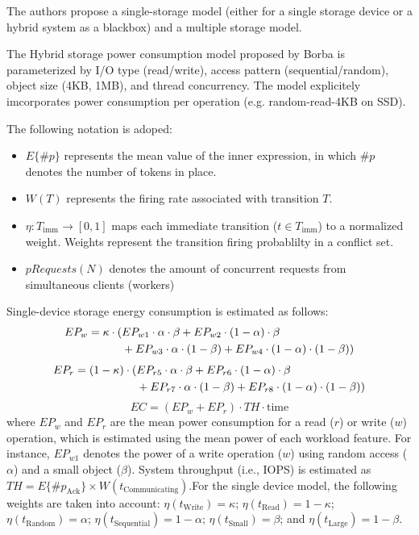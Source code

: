The authors propose a single-storage model (either for a single storage device or a hybrid system as a blackbox) and a multiple storage model.

The Hybrid storage power consumption model proposed by Borba is parameterized by I/O type (read/write), access pattern (sequential/random), object size (4KB, 1MB), and thread concurrency. The model explicitely imcorporates power consumption per operation (e.g. random-read-4KB on SSD).

The following notation is adoped:
\begin{itemize}
    \item $E\{\#p\}$ represents the mean value of the inner expression, in which $\#p$ denotes the number of tokens in place.
    \item $W(T)$ represents the firing rate associated with transition $T$.
    \item $\eta : T_{\text{imm}} \rightarrow [0, 1]$ maps each immediate transition ($t \in T_{\text{imm}}$) to a normalized weight. Weights represent the transition firing probablilty in a conflict set.
    \item $pRequests(N)$ denotes the amount of concurrent requests from simultaneous clients (workers)
\end{itemize}

Single-device storage energy consumption is estimated as follows:
\begin{align}
    EP_w = \kappa \cdot (&EP_{w1} \cdot \alpha \cdot \beta 
        + EP_{w2} \cdot (1 - \alpha) \cdot \beta \notag \\
        &+ EP_{w3} \cdot \alpha \cdot (1 - \beta) 
        + EP_{w4} \cdot (1 - \alpha) \cdot (1 - \beta))
\end{align}
\begin{align}
    EP_r = (1 - \kappa) \cdot (&EP_{r5} \cdot \alpha \cdot \beta 
        + EP_{r6} \cdot (1 - \alpha) \cdot \beta \notag \\
        &+ EP_{r7} \cdot \alpha \cdot (1 - \beta) 
        + EP_{r8} \cdot (1 - \alpha) \cdot (1 - \beta))
\end{align}
\begin{equation}
    EC = (EP_w + EP_r) \cdot TH \cdot \text{time}
\end{equation}
where $EP_w$ and $EP_r$ are the mean power consumption for a read ($r$) or write ($w$) operation, which is estimated using the mean power of each workload feature. For instance, $EP_{w1}$ denotes the power of a write operation ($w$) using random access ($\alpha$) and a small object ($\beta$). System throughput (i.e., IOPS) is estimated as $TH = E\{\#p_{\text{Ack}}\} \times W(t_{\text{Communicating}})$.For the single device model, the following weights are taken into account:
$\eta(t_{\text{Write}}) = \kappa$;  
$\eta(t_{\text{Read}}) = 1 - \kappa$;  
$\eta(t_{\text{Random}}) = \alpha$;  
$\eta(t_{\text{Sequential}}) = 1 - \alpha$;  
$\eta(t_{\text{Small}}) = \beta$; and  
$\eta(t_{\text{Large}}) = 1 - \beta$.

